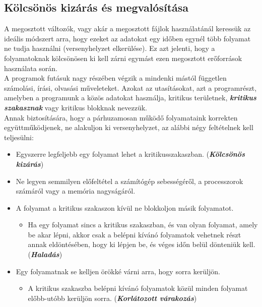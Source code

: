 \documentclass[tikz,12pt,margin=0px]{article}
\begin{document}
	\subsection*{Kölcsönös kizárás és megvalósítása}
	
    A megosztott változók, vagy akár a megosztott fájlok használatánál keressük az ideális módszert arra, hogy ezeket az adatokat egy időben egynél több folyamat ne tudja használni (versenyhelyzet elkerülése). Ez azt jelenti, hogy a folyamatoknak kölcsönösen ki kell zárni egymást ezen megosztott erőforrások használata során.\\

    \noindent A programok futásuk nagy részében végzik a mindenki mástól független számolási, írási, olvasási műveleteket. Azokat az utasításokat, azt a programrészt, amelyben a programunk a közös adatokat használja, kritikus területnek, \textbf{\emph{kritikus szakasznak}} vagy kritikus blokknak nevezzük.\\

    \noindent Annak biztosítására, hogy a párhuzamosan működő folyamataink korrekten együttműködjenek, ne alakuljon ki versenyhelyzet, az alábbi négy feltételnek kell teljesülni:
    \begin{itemize}[topsep=8pt,itemsep=4pt,partopsep=4pt, parsep=4pt]
        \item Egyszerre legfeljebb egy folyamat lehet a kritikusszakaszban. (\textbf{\emph{Kölcsönös kizárás}})
        \item Ne legyen semmilyen előfeltétel a számítógép sebességéről, a processzorok számáról vagy a memória nagyságáról.
        \item A folyamat a kritikus szakaszon kívül ne blokkoljon másik folyamatot.
        \begin{itemize}
            \item Ha egy folyamat sincs a kritikus szakaszban, és van olyan folyamat, amely be akar lépni, akkor csak a belépni kívánó folyamatok vehetnek részt annak eldöntésében, hogy ki lépjen be, és véges időn belül dönteniük kell. (\textbf{\emph{Haladás}})
        \end{itemize}
        \item Egy folyamatnak se kelljen örökké várni arra, hogy sorra kerüljön.
        \begin{itemize}
            \item A kritikus szakaszba belépni kívánó folyamatok közül minden folyamat előbb-utóbb kerüljön sorra. (\textbf{\emph{Korlátozott várakozás}})
        \end{itemize}
    \end{itemize}
\end{document}
